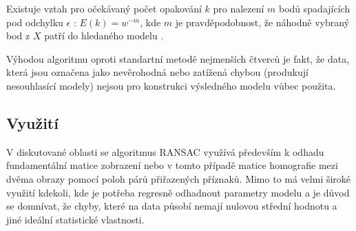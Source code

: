 		Existuje vztah pro očekávaný počet opakování $k$ pro nalezení $m$ bodů spadajících pod odchylku $\epsilon$ :
		$E(k) = w^{-m}$, kde $m$ je pravděpodobnost, že náhodně vybraný bod z $X$ patří do hledaného modelu \cite{fischler1981random} .
	
		Výhodou algoritmu oproti standartní metodě nejmenších čtverců je fakt, že data, která jsou označena jako nevěrohodná nebo zatížená chybou (produkují nesouhlasící modely) nejsou pro konstrukci výsledného modelu vůbec použita.
		
	\subsection{Využití}
		V diskutované oblasti se algoritmus RANSAC využívá především k odhadu fundamentální matice zobrazení nebo v tomto případě matice homografie mezi dvěma obrazy pomocí poloh párů přiřazených příznaků. Mimo to má velmi široké využití kdekoli, kde je potřeba regresně odhadnout parametry modelu a je důvod se domnívat, že chyby, které na data působí nemají nulovou střední hodnotu a jiné ideální statistické vlastnosti.
	